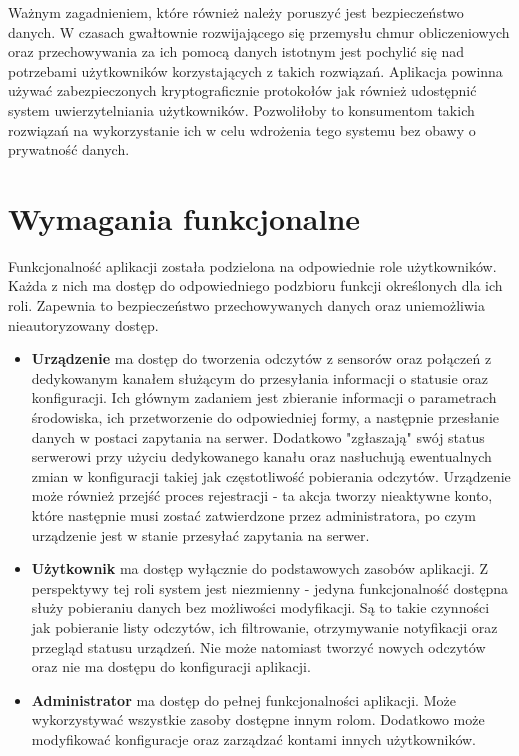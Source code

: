 Ważnym zagadnieniem, które również należy poruszyć jest bezpieczeństwo danych.
W czasach gwałtownie rozwijającego się przemysłu chmur obliczeniowych oraz przechowywania
za ich pomocą danych istotnym jest pochylić się nad potrzebami użytkowników korzystających
z takich rozwiązań. Aplikacja powinna używać zabezpieczonych kryptograficznie protokołów 
jak również udostępnić system uwierzytelniania użytkowników. Pozwoliłoby to konsumentom
takich rozwiązań na wykorzystanie ich w celu wdrożenia tego systemu bez obawy o prywatność
danych.

\section{Wymagania funkcjonalne}
Funkcjonalność aplikacji została podzielona na odpowiednie role użytkowników. 
Każda z nich ma dostęp do odpowiedniego podzbioru funkcji określonych dla ich roli.
Zapewnia to bezpieczeństwo przechowywanych danych oraz uniemożliwia nieautoryzowany dostęp.
\begin{itemize}
  \item \textbf{Urządzenie} ma dostęp do tworzenia odczytów z sensorów oraz połączeń z dedykowanym
    kanałem służącym do przesyłania informacji o statusie oraz konfiguracji. Ich głównym zadaniem
    jest zbieranie informacji o parametrach środowiska, ich przetworzenie do odpowiedniej
    formy, a następnie przesłanie danych w postaci zapytania na serwer. Dodatkowo "zgłaszają"
    swój status serwerowi przy użyciu dedykowanego kanału oraz nasłuchują ewentualnych zmian
    w konfiguracji takiej jak częstotliwość pobierania odczytów. Urządzenie może również
    przejść proces rejestracji - ta akcja tworzy nieaktywne konto, które następnie
    musi zostać zatwierdzone przez administratora, po czym urządzenie jest w stanie
    przesyłać zapytania na serwer.
  \item \textbf{Użytkownik} ma dostęp wyłącznie do podstawowych zasobów aplikacji. Z perspektywy
    tej roli system jest niezmienny - jedyna funkcjonalność dostępna służy pobieraniu danych
    bez możliwości modyfikacji. Są to takie czynności jak pobieranie listy odczytów, ich filtrowanie,
    otrzymywanie notyfikacji oraz przegląd statusu urządzeń. Nie może natomiast tworzyć nowych
    odczytów oraz nie ma dostępu do konfiguracji aplikacji.
  \item \textbf{Administrator} ma dostęp do pełnej funkcjonalności aplikacji. Może wykorzystywać
    wszystkie zasoby dostępne innym rolom. Dodatkowo może modyfikować konfiguracje oraz zarządzać kontami
    innych użytkowników.
\end{itemize}

